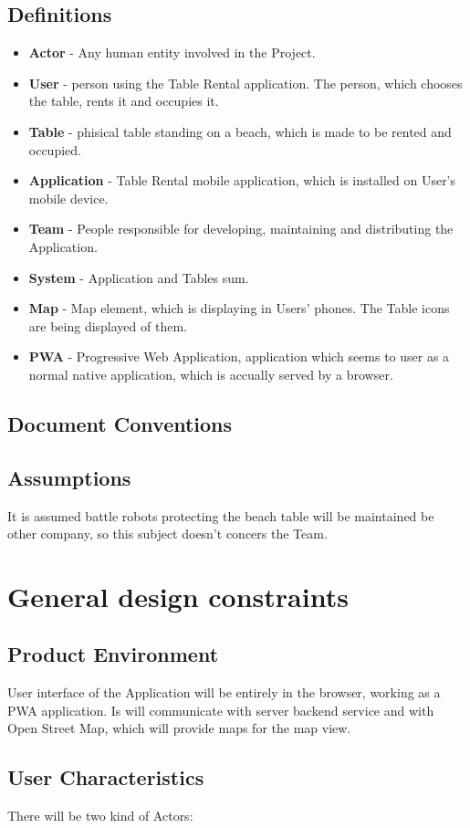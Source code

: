 \documentclass[14pt]{extarticle}
\begin{document}
\subsection{Definitions}
\begin{itemize}
    \item \textbf{Actor} - Any human entity involved in the Project.
    \item \textbf{User} - person using the Table Rental application. The person, which chooses the table, rents it and occupies it.
    \item \textbf{Table} - phisical table standing on a beach, which is made to be rented and occupied.
    \item \textbf{Application} - Table Rental mobile application, which is installed on User's mobile device.
    \item \textbf{Team} - People responsible for developing, maintaining and distributing the Application.
    \item \textbf{System} - Application and Tables sum.
    \item \textbf{Map} - Map element, which is displaying in Users' phones. The Table icons are being displayed of them.
    \item \textbf{PWA} - Progressive Web Application, application which seems to user as a normal native application, which is accually served by a browser.
\end{itemize}
\subsection{Document Conventions}
\subsection{Assumptions}
It is assumed battle robots protecting the beach table will be maintained be other company, so this subject doesn't concers the Team.
\section{General design constraints}
\subsection{Product Environment}
User interface of the Application will be entirely in the browser, working as a PWA application. Is will communicate with server backend service and with Open Street Map, which will provide maps for the map view.
\subsection{User Characteristics}
There will be two kind of Actors:
\end{document}
